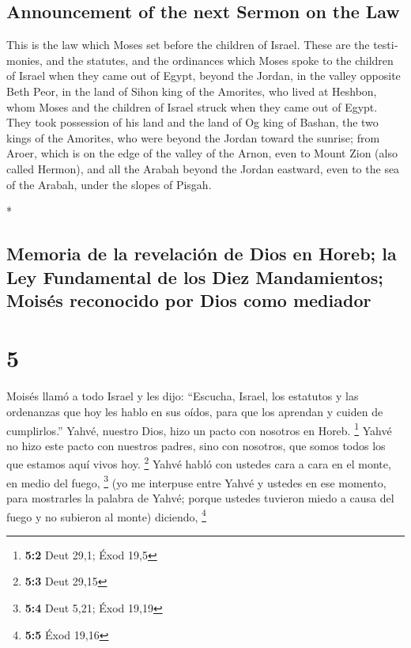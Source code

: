 \begin{paracol}{2}
\begin{otherlanguage}{english}
\hypertarget{announcement-of-the-next-sermon-on-the-law}{%
\subsection{Announcement of the next Sermon on the
Law}\label{announcement-of-the-next-sermon-on-the-law}}

 This is the law which Moses set before the children of
Israel.  These are the testimonies, and the statutes, and
the ordinances which Moses spoke to the children of Israel when they
came out of Egypt,  beyond the Jordan, in the valley
opposite Beth Peor, in the land of Sihon king of the Amorites, who lived
at Heshbon, whom Moses and the children of Israel struck when they came
out of Egypt.  They took possession of his land and the
land of Og king of Bashan, the two kings of the Amorites, who were
beyond the Jordan toward the sunrise;  from Aroer, which
is on the edge of the valley of the Arnon, even to Mount Zion (also
called Hermon),  and all the Arabah beyond the Jordan
eastward, even to the sea of the Arabah, under the slopes of Pisgah.

\end{otherlanguage}

\switchcolumn[0]*

\hypertarget{memoria-de-la-revelaciuxf3n-de-dios-en-horeb-la-ley-fundamental-de-los-diez-mandamientos-moisuxe9s-reconocido-por-dios-como-mediador}{%
\subsection{Memoria de la revelación de Dios en Horeb; la Ley
Fundamental de los Diez Mandamientos; Moisés reconocido por Dios como
mediador}\label{memoria-de-la-revelaciuxf3n-de-dios-en-horeb-la-ley-fundamental-de-los-diez-mandamientos-moisuxe9s-reconocido-por-dios-como-mediador}}

\hypertarget{section-8}{%
\section{5}\label{section-8}}

 Moisés llamó a todo Israel y les dijo: ``Escucha, Israel,
los estatutos y las ordenanzas que hoy les hablo en sus oídos, para que
los aprendan y cuiden de cumplirlos.''  Yahvé, nuestro
Dios, hizo un pacto con nosotros en Horeb. \footnote{\textbf{5:2} Deut
  29,1; Éxod 19,5}  Yahvé no hizo este pacto con nuestros
padres, sino con nosotros, que somos todos los que estamos aquí vivos
hoy. \footnote{\textbf{5:3} Deut 29,15}  Yahvé habló con
ustedes cara a cara en el monte, en medio del fuego, \footnote{\textbf{5:4}
  Deut 5,21; Éxod 19,19}  (yo me interpuse entre Yahvé y
ustedes en ese momento, para mostrarles la palabra de Yahvé; porque
ustedes tuvieron miedo a causa del fuego y no subieron al monte)
diciendo, \footnote{\textbf{5:5} Éxod 19,16}


\end{paracol}
